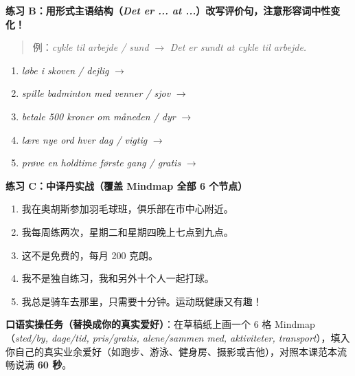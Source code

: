 \textbf{练习 B：用形式主语结构（\textit{Det er ... at ...}）改写评价句，注意形容词中性变化！}
\begin{quote}
\small 例：\textit{cykle til arbejde / sund} $\rightarrow$ \textit{Det er sundt at cykle til arbejde.}
\end{quote}
\begin{enumerate}
  \item \textit{løbe i skoven / dejlig} $\rightarrow$
  \item \textit{spille badminton med venner / sjov} $\rightarrow$
  \item \textit{betale 500 kroner om måneden / dyr} $\rightarrow$
  \item \textit{lære nye ord hver dag / vigtig} $\rightarrow$
  \item \textit{prøve en holdtime første gang / gratis} $\rightarrow$
\end{enumerate}

\textbf{练习 C：中译丹实战（覆盖 Mindmap 全部 6 个节点）}
\begin{enumerate}
  \item 我在奥胡斯参加羽毛球班，俱乐部在市中心附近。
  \item 我每周练两次，星期二和星期四晚上七点到九点。
  \item 这不是免费的，每月 200 克朗。
  \item 我不是独自练习，我和另外十个人一起打球。
  \item 我总是骑车去那里，只需要十分钟。运动既健康又有趣！
\end{enumerate}


\textbf{口语实操任务（替换成你的真实爱好）}：在草稿纸上画一个 6 格 Mindmap（\textit{sted/by, dage/tid, pris/gratis, alene/sammen med, aktiviteter, transport}），填入你自己的真实业余爱好（如跑步、游泳、健身房、摄影或吉他），对照本课范本流畅说满 \textbf{60 秒}。

